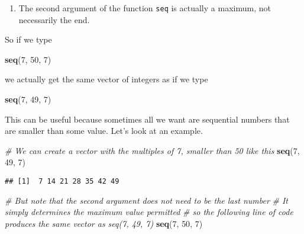 \documentclass[]{article}
\newenvironment{Shaded}{\begin{snugshade}}{\end{snugshade}}
\newcommand{\CommentTok}[1]{\textcolor[rgb]{0.56,0.35,0.01}{\textit{#1}}}
\newcommand{\DecValTok}[1]{\textcolor[rgb]{0.00,0.00,0.81}{#1}}
\newcommand{\KeywordTok}[1]{\textcolor[rgb]{0.13,0.29,0.53}{\textbf{#1}}}
\newcommand{\NormalTok}[1]{#1}
\providecommand{\tightlist}{%
  \setlength{\itemsep}{0pt}\setlength{\parskip}{0pt}}
\begin{document}
\begin{enumerate}
\def\labelenumi{\arabic{enumi}.}
\setcounter{enumi}{7}
\tightlist
\item
  The second argument of the function \texttt{seq} is actually a
  maximum, not necessarily the end.
\end{enumerate}

So if we type

\begin{Shaded}
\begin{Highlighting}[]
\KeywordTok{seq}\NormalTok{(}\DecValTok{7}\NormalTok{, }\DecValTok{50}\NormalTok{, }\DecValTok{7}\NormalTok{)}
\end{Highlighting}
\end{Shaded}

we actually get the same vector of integers as if we type

\begin{Shaded}
\begin{Highlighting}[]
\KeywordTok{seq}\NormalTok{(}\DecValTok{7}\NormalTok{, }\DecValTok{49}\NormalTok{, }\DecValTok{7}\NormalTok{)}
\end{Highlighting}
\end{Shaded}

This can be useful because sometimes all we want are sequential numbers
that are smaller than some value. Let's look at an example.

\begin{Shaded}
\begin{Highlighting}[]
\CommentTok{# We can create a vector with the multiples of 7, smaller than 50 like this }
\KeywordTok{seq}\NormalTok{(}\DecValTok{7}\NormalTok{, }\DecValTok{49}\NormalTok{, }\DecValTok{7}\NormalTok{) }
\end{Highlighting}
\end{Shaded}

\begin{verbatim}
## [1]  7 14 21 28 35 42 49
\end{verbatim}

\begin{Shaded}
\begin{Highlighting}[]
\CommentTok{# But note that the second argument does not need to be the last number}
\CommentTok{# It simply determines the maximum value permitted}
\CommentTok{# so the following line of code produces the same vector as seq(7, 49, 7)}
\KeywordTok{seq}\NormalTok{(}\DecValTok{7}\NormalTok{, }\DecValTok{50}\NormalTok{, }\DecValTok{7}\NormalTok{)}
\end{Highlighting}
\end{Shaded}
\end{document}
